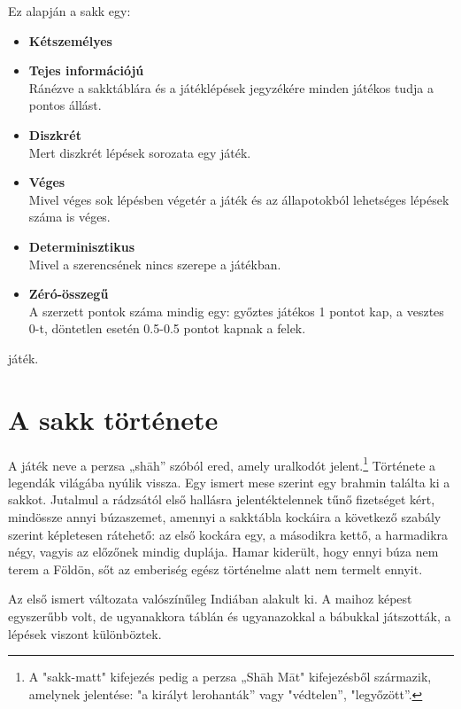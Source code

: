 \documentclass[twoside, a4paper, 12pt]{book}
\begin{document}
Ez alapján a sakk egy:
\begin{itemize}
	\item \textbf{Kétszemélyes}
	
	\item \textbf{Tejes információjú} \\
	Ránézve a sakktáblára és a játéklépések jegyzékére minden játékos tudja a pontos állást.
	
	\item \textbf{Diszkrét} \\
	Mert diszkrét lépések sorozata egy játék.
	
	\item \textbf{Véges} \\
	Mivel véges sok lépésben végetér a játék és az állapotokból lehetséges lépések száma is véges.
	
	\item \textbf{Determinisztikus} \\
	Mivel a szerencsének nincs szerepe a játékban.
	
	\item \textbf{Zéró-összegű} \\
	A szerzett pontok száma mindig egy: győztes játékos 1 pontot kap, a vesztes 0-t, döntetlen esetén 0.5-0.5 pontot kapnak a felek.
\end{itemize}
játék.

\section{A sakk története}
A játék neve a perzsa „shāh” szóból ered, amely uralkodót jelent.\footnote{A "sakk-matt" kifejezés pedig a perzsa „Shāh Māt" kifejezésből származik, amelynek jelentése: "a királyt lerohanták” vagy "védtelen”, "legyőzött”.\cite{ChessMateHu}\cite{ChessMateEn}} Története a legendák világába nyúlik vissza. Egy ismert mese szerint egy brahmin találta ki a sakkot. Jutalmul a rádzsától első hallásra jelentéktelennek tűnő fizetséget kért, mindössze annyi búzaszemet, amennyi a sakktábla kockáira a következő szabály szerint képletesen rátehető: az első kockára egy, a másodikra kettő, a harmadikra négy, vagyis az előzőnek mindig duplája. Hamar kiderült, hogy ennyi búza nem terem a Földön, sőt az emberiség egész történelme alatt nem termelt ennyit.

Az első ismert változata valószínűleg Indiában alakult ki. A maihoz képest egyszerűbb volt, de ugyanakkora táblán és ugyanazokkal a bábukkal játszották, a lépések viszont különböztek. 
\end{document}
